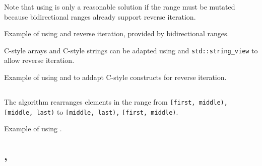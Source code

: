 Note that using  is only a reasonable solution if the range must be mutated because bidirectional ranges already support reverse iteration.

\begin{codebox}[]{\href{https://compiler-explorer.com/z/onsj6dvqK}{\ExternalLink}}
\footnotesize Example of using  and reverse iteration, provided by bidirectional ranges.
\tcblower
{}
\end{codebox}

C-style arrays and C-style strings can be adapted using  and \texttt{std::string\-\_view} to allow reverse iteration.

\begin{codebox}[]{\href{https://compiler-explorer.com/z/YW8sEa4c3}{\ExternalLink}}
\footnotesize Example of using  and  to addapt C-style constructs for reverse iteration.
\tcblower
{}
\end{codebox}

\subsection{\texorpdfstring{}{\texttt{std::rotate}}}

The  algorithm rearranges elements in the range from \texttt{[first, middle),} \texttt{[middle, last)} to \texttt{[middle, last),} \texttt{[first, middle)}.


\begin{codebox}[]{\href{https://compiler-explorer.com/z/dP7TMfjKv}{\ExternalLink}}
\footnotesize Example of using .
\tcblower
{}
\end{codebox}

\subsection{\texorpdfstring{, }{\texttt{std::shift\_left}, \texttt{std::shift\_right}}}

